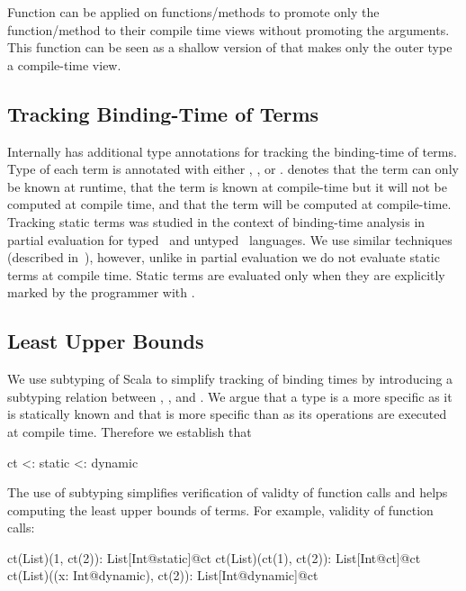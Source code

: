 Function  can be applied on functions/methods to promote only the function/method
 to their compile time views without promoting the arguments. This function can be
 seen as a shallow version of  that makes only the outer type a compile-time view.

\subsection{Tracking Binding-Time of Terms}
\label{sct:static}


 Internally \tool has additional type annotations for tracking the binding-time of terms.
  Type of each term is annotated with either , , or .  denotes
  that the term can only be known at runtime,  that the term is known
  at compile-time but it will not be computed at compile time, and  that
  the term will be computed at compile-time.
 Tracking static terms was studied in the context of binding-time analysis
  in partial evaluation for typed~\cite{nielson_1988_automatic} and
  untyped~\cite{gomard1991partial} languages. We use similar techniques
  (described in~), however, unlike in partial evaluation we
  do not evaluate static terms at compile time. Static terms are evaluated only
  when they are explicitly marked by the programmer with .

\subsection{Least Upper Bounds}
\label{sct:lub}

 We use subtyping of Scala to simplify tracking of binding times by introducing a
 subtyping relation between , , and . We argue that
 a  type is a more specific  as it is statically known
 and that  is more specific than  as its operations are executed
 at compile time. Therefore we establish that\begin{lstparagraph}
                 ct <: static <: dynamic
\end{lstparagraph}

 The use of subtyping simplifies verification of validty of function calls and helps computing the
 least upper bounds of terms. For example, validity of function calls:\begin{lstparagraph}
   ct(List)(1, ct(2)): List[Int@static]@ct
   ct(List)(ct(1), ct(2)): List[Int@ct]@ct
   ct(List)((x: Int@dynamic), ct(2)): List[Int@dynamic]@ct
\end{lstparagraph}

